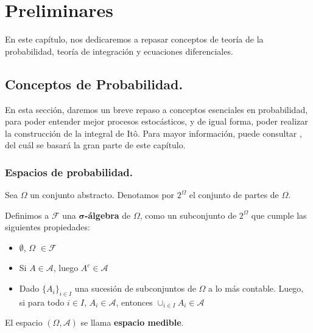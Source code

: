 
\chapter{Preliminares}


En este capítulo, nos dedicaremos a repasar conceptos de teoría de la probabilidad, teoría de integración y ecuaciones diferenciales. 








\section{Conceptos de Probabilidad.}

En esta sección, daremos un breve repaso a conceptos esenciales en probabilidad, para poder entender mejor procesos estocásticos, y de igual forma, poder realizar la construcción de la integral de Itô. Para mayor información, puede consultar \cite{Probability_Essentials}, del cuál se basará la gran parte de este capítulo.

\subsection{Espacios de probabilidad.}

Sea $\Omega$ un conjunto abstracto. Denotamos por $2^{\Omega}$ el conjunto de partes de $\Omega$.

\begin{boxDef}
Definimos a $\mathcal{F}$ una $\mathbf{\sigma}$\textbf{-álgebra} de $\Omega$, como un subconjunto de $2^{\Omega}$ que cumple las siguientes propiedades:

	\begin{itemize}
		\item $\emptyset$, $\Omega$ $\in \mathcal{F}$
		\item Si $A \in \mathcal{A}$, luego $A^{c} \in \mathcal{A}$
		\item Dado $\{ A_i \}_{i \in I}$ una sucesión de subconjuntos de $\Omega$ a lo más contable. Luego, si para todo $i \in I$, $A_i \in \mathcal{A}$, entonces $\cup_{i \in I} A_i \in \mathcal{A}$ 
	\end{itemize}

El espacio $\left( \Omega, \mathcal{A} \right)$ se llama \textbf{espacio medible}.

\end{boxDef}



